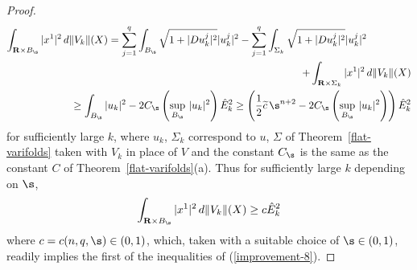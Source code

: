 \documentclass[a4paper,11pt]{amsart}
\begin{document}
\begin{proof}
\begin{eqnarray*}
\int_{{\mathbf R} \times B_{\s}} |x^{1}|^{2} \, d\|V_{k}\|(X) = \sum_{j=1}^{q}\int_{B_{\s}} \sqrt{1 + |Du_{k}^{j}|^{2}}|u_{k}^{j}|^{2}  - \sum_{j=1}^{q}\int_{\Sigma_{k}} \sqrt{1 + |Du_{k}^{j}|^{2}}|u_{k}^{j}|^{2}&&\nonumber\\
&&\hspace{-1in} + \int_{{\mathbf R} \times \Sigma_{k}} |x^{1}|^{2} \, d\|V_{k}\|(X)\nonumber\\
&&\hspace{-5in}\geq \int_{B_{\s}}|u_{k}|^{2} - 2C_{\s}\left(\sup_{B_{\s}} \,|u_{k}|^{2}\right){\hat E}_{k}^{2} \geq \left(\frac{1}{2}\widetilde{c} \, \s^{n+2} - 2C_{\s}\left(\sup_{B_{\s}} \,|u_{k}|^{2}\right)\right){\hat E}_{k}^{2} 
\end{eqnarray*}
for sufficiently large $k$, where $u_{k}$, $\Sigma_{k}$ correspond to $u$, $\Sigma$ of Theorem~\ref{flat-varifolds} taken with $V_{k}$ in place of $V$ and the constant $C_{\s}$ is the same as the constant $C$ of Theorem~\ref{flat-varifolds}(a). Thus for sufficiently large $k$ depending on $\s$,  
\begin{equation}\label{improvement-8-1}
\int_{{\mathbf R} \times B_{\s}}|x^{1}|^{2} \, d\|V_{k}\|(X) \geq c{\hat E}_{k}^{2}
\end{equation}
where $c = c(n, q, \s) \in (0, 1)$, which, taken with a suitable choice of $\s \in (0, 1)$,  readily implies the first of the inequalities of (\ref{improvement-8}). 
 

\end{proof}
\end{document}
